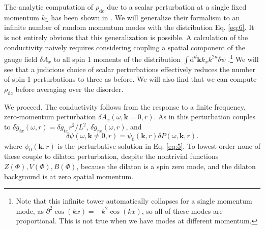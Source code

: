 \documentclass[10pt, oneside]{book}
\begin{document}
\begin{doublespace}
The analytic computation of $\rho_{\mathrm{dc}}$ due to a scalar perturbation at a single fixed momentum $k_{\mathrm{L}}$ has been shown in \cite{Blake:2013owa}.
We will generalize their formalism to an infinite number of random momentum modes with the distribution Eq. \eqref{eq:6}.
It is not entirely obvious that this generalization is possible. A calculation of the conductivity naively requires considering coupling a spatial component of the gauge field $\delta A_x$ to all spin 1 moments of the distribution $\int \mathrm{d}^d \mathbf{k} k_x k^{2n} \delta \psi$%
.\footnote{Note that this infinite tower automatically collapses for a single momentum mode, as $\partial^2 \cos(kx) = -k^2 \cos(kx)$, so all of these modes are proportional.  This is not true when we have modes at different momentum.
}
We will see that a judicious choice of scalar perturbations effectively reduces the number of spin 1 perturbations to three as before. We will also find that we can compute $\rho_{\mathrm{dc}}$ before averaging over the disorder.

We %
proceed. The conductivity follows from the response to a finite frequency, zero-momentum perturbation $\delta A_x(\omega, \mathbf{k}=0,r)$. As in \cite{Blake:2013owa} this perturbation couples to $\delta \tilde{g}_{tx}(\omega,r) = \delta g_{tx}r^2/L^2$, $\delta\tilde{g}_{rx}(\omega,r)$, and 
\begin{equation}
\delta \psi(\omega,\mathbf{k}\neq 0,r) = \psi_0(\mathbf{k},r) \delta P(\omega,\mathbf{k},r).
\end{equation}
where $\psi_0(\mathbf{k},r)$ is the perturbative solution in Eq. \eqref{eq:5}.
To lowest order none of these couple to dilaton perturbation, despite the nontrivial functions $Z(\Phi), V(\Phi), B(\Phi)$, because the dilaton is a spin zero mode, and the dilaton background is at zero spatial momentum.   


\end{doublespace}
\end{document}
